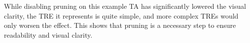 \begin{center}
    
\end{center}
\vspace{0.75em}


While disabling pruning on this example TA has significantly lowered the visual clarity, the TRE it represents is quite simple, and more complex TREs would only worsen the effect. This shows that pruning is a necessary step to ensure readability and visual clarity.